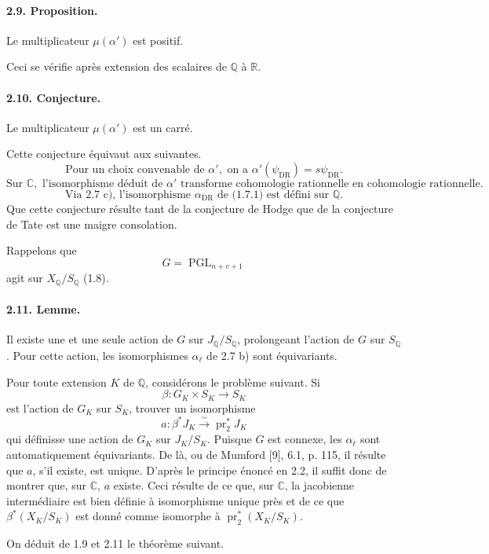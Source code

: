 \documentclass[10pt]{article}
\newcommand{\C}{\mathbb C}
\newcommand{\Q}{\mathbb Q}
\newcommand{\R}{\mathbb R}
\newcommand{\DR}{\mathrm{DR}}
\newcommand{\PGL}{\operatorname{PGL}}
\newcommand{\iso}{\xrightarrow{\sim}}
\begin{document}
\paragraph{2.9. Proposition.} Le multiplicateur \(\mu(\alpha')\) est positif.

Ceci se vérifie après extension des scalaires de \(\Q\) à \(\R\).

\paragraph{2.10. Conjecture.} Le multiplicateur \(\mu(\alpha')\) est un carré.

Cette conjecture équivaut aux suivantes.
\[
\tag{2.10.1}
\text{Pour un choix convenable de }\alpha',\text{ on a }\alpha'(\psi_{\DR})=s\psi_{\DR}.
\]
\[
\tag{2.10.2}
\text{Sur }\C,\text{ l'isomorphisme déduit de }\alpha'\text{ transforme cohomologie rationnelle en cohomologie rationnelle.}
\]
\[
\tag{2.10.3}
\text{Via 2.7 c), l'isomorphisme }\alpha_{\DR}\text{ de (1.7.1) est défini sur }\Q.
\]
Que cette conjecture résulte tant de la conjecture de Hodge que de la conjecture de Tate est une maigre consolation.

Rappelons que
\[
G=\PGL_{n+v+1}
\]
agit sur \(X_\Q/S_\Q\) (1.8).

\paragraph{2.11. Lemme.} Il existe une et une seule action de \(G\) sur \(J_\Q/S_\Q\), prolongeant l'action de \(G\) sur \(S_\Q\). Pour cette action, les isomorphismes \(\alpha_\ell\) de 2.7 b) sont équivariants.

Pour toute extension \(K\) de \(\Q\), considérons le problème suivant. Si
\[
\beta:G_K\times S_K\longrightarrow S_K
\]
est l'action de \(G_K\) sur \(S_K\), trouver un isomorphisme
\[
a:\beta^*J_K\iso \operatorname{pr}_2^*J_K
\]
qui définisse une action de \(G_K\) sur \(J_K/S_K\). Puisque \(G\) est connexe, les \(\alpha_\ell\) sont automatiquement équivariants. De là, ou de Mumford [9], 6.1, p. 115, il résulte que \(a\), s'il existe, est unique. D'après le principe énoncé en 2.2, il suffit donc de montrer que, sur \(\C\), \(a\) existe. Ceci résulte de ce que, sur \(\C\), la jacobienne intermédiaire est bien définie à isomorphisme unique près et de ce que \(\beta^*(X_K/S_K)\) est donné comme isomorphe à \(\operatorname{pr}_2^*(X_K/S_K)\).

On déduit de 1.9 et 2.11 le théorème suivant.
\end{document}
